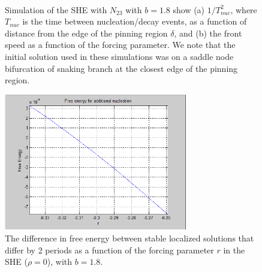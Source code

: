 \documentclass[pre,preprint,superscriptaddress]{revtex4-1}
\begin{document}
 \begin{figure}[!htb]
  \begin{center}
    \mbox{
       \quad
      }
    \caption{Simulation of the SHE with $N_{23}$ with $b=1.8$ show (a) $1/T_{nuc}^2$, where $T_{nuc}$ is the time between nucleation/decay events, as a function of distance from the edge of the pinning region  $\delta$, and (b) the front speed as a function of the forcing parameter. We note that the initial solution used in these simulations was on a saddle node bifurcation of snaking branch at the closest edge of the pinning region. }
    \label{fig:nucleation}
  \end{center}
\end{figure} 


\begin{figure}[!htb]\center
\includegraphics[width=80mm]{FEnucleation.png}
\caption{\label{fig:FEnuc} The difference in free energy between stable localized solutions that differ by 2 periods as a function of the forcing parameter $r$ in the SHE ($\rho=0$), with $b=1.8$.}
\end{figure}
\end{document}
